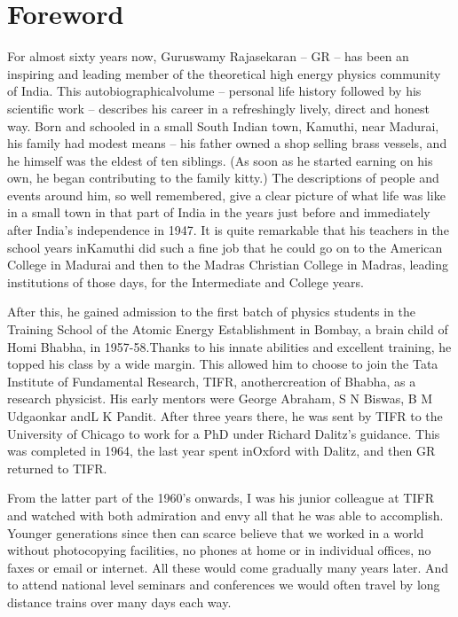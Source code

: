 \chapter{Foreword}


For almost sixty years now, Guruswamy Rajasekaran – GR – has been an 
inspiring and leading member of the theoretical high energy physics 
community of India. This autobiographical\break volume – personal life 
history followed by his scientific work – describes his career in a 
refreshingly lively, direct and honest way. Born and schooled in a 
small South Indian town, Kamuthi, near Madurai, his family had modest 
means – his father owned a shop selling brass vessels, and he himself 
was the eldest of ten siblings. (As soon as he started earning on his 
own, he began contributing to the family kitty.) The descriptions of 
people and events around him, so well remembered, give a clear picture 
of what life was like in a small town in that part of India in the 
years just before and immediately after India’s independence in 1947. It 
is quite remarkable that his teachers in the school years in\break Kamuthi 
did such a fine job that he could go on to the American College in 
Madurai and then to the Madras Christian College in Madras, leading 
institutions of those days, for the Intermediate and College years.

After this, he gained admission to the first batch of physics students 
in the Training School of the Atomic Energy Establishment in Bombay, a 
brain child of Homi Bhabha, in 1957-58.\break Thanks to his innate abilities 
and excellent training, he topped his class by a wide margin. This 
allowed him to choose to join the Tata Institute of Fundamental 
Research, TIFR, another\break creation of Bhabha, as a research physicist. 
His early mentors were George Abraham, S N Biswas, B M Udgaonkar and\break L 
K Pandit. After three years there, he was sent by TIFR to the 
University of Chicago to work for a PhD under Richard Dalitz’s 
guidance. This was completed in 1964, the last year spent in\break Oxford 
with Dalitz, and then GR returned to TIFR.


From the latter part of the 1960’s onwards, I was his junior colleague 
at TIFR and watched with both admiration and envy all that he was able 
to accomplish. Younger generations since then can scarce believe that 
we worked in a world without photo\-copying facilities, no phones at home 
or in individual offices, no faxes or email or internet. All these 
would come gradually many years later. And to attend national level 
seminars and confe\-rences we would often travel by long distance trains 
over many days each way.

